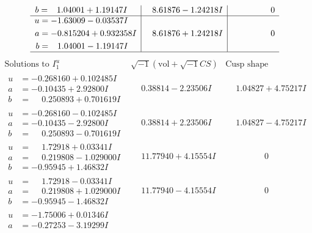 \documentclass[1p]{elsarticle_modified}
\theoremstyle{definition}
\newcommand{\I}{\sqrt{-1}}
\begin{document}
$$\begin{array}{c|c|c}
\begin{aligned}
b &= \phantom{-}1.04001 + 1.19147 I\end{aligned}
 & \phantom{-}8.61876 - 1.24218 I & \phantom{-0.000000 } 0 \\ \hline\begin{aligned}
u &= -1.63009 - 0.03537 I \\
a &= -0.815204 + 0.932358 I \\
b &= \phantom{-}1.04001 - 1.19147 I\end{aligned}
 & \phantom{-}8.61876 + 1.24218 I & \phantom{-0.000000 } 0\\
 \hline 
 \end{array}$$\newpage$$\begin{array}{c|c|c}  
\text{Solutions to }I^u_{1}& \I (\text{vol} + \sqrt{-1}CS) & \text{Cusp shape}\\
 \hline 
\begin{aligned}
u &= -0.268160 + 0.102485 I \\
a &= -0.10435 + 2.92800 I \\
b &= \phantom{-}0.250893 + 0.701619 I\end{aligned}
 & \phantom{-}0.38814 - 2.23506 I & \phantom{-}1.04827 + 4.75217 I \\ \hline\begin{aligned}
u &= -0.268160 - 0.102485 I \\
a &= -0.10435 - 2.92800 I \\
b &= \phantom{-}0.250893 - 0.701619 I\end{aligned}
 & \phantom{-}0.38814 + 2.23506 I & \phantom{-}1.04827 - 4.75217 I \\ \hline\begin{aligned}
u &= \phantom{-}1.72918 + 0.03341 I \\
a &= \phantom{-}0.219808 - 1.029000 I \\
b &= -0.95945 + 1.46832 I\end{aligned}
 & \phantom{-}11.77940 + 4.15554 I & \phantom{-0.000000 } 0 \\ \hline\begin{aligned}
u &= \phantom{-}1.72918 - 0.03341 I \\
a &= \phantom{-}0.219808 + 1.029000 I \\
b &= -0.95945 - 1.46832 I\end{aligned}
 & \phantom{-}11.77940 - 4.15554 I & \phantom{-0.000000 } 0 \\ \hline\begin{aligned}
u &= -1.75006 + 0.01346 I \\
a &= -0.27253 - 3.19299 I \\

\end{aligned}
\end{array}$$
\end{document}
